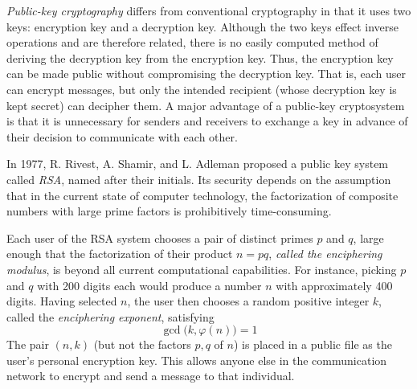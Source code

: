 \documentclass{article}
\begin{document}
\textit{Public-key cryptography} differs from conventional cryptography in that it uses two keys: encryption key and a decryption key. Although the two keys effect inverse operations and are therefore related, there is no easily computed method of deriving the decryption key from the encryption key. Thus, the encryption key can be made public without compromising the decryption key. That is, each user can encrypt messages, but only the intended recipient (whose decryption key is kept secret) can decipher them. A major advantage of a public-key cryptosystem is that it is unnecessary for senders and receivers to exchange a key in advance of their decision to communicate with each other. 

In 1977, R. Rivest, A. Shamir, and L. Adleman proposed a public key system called \textit{RSA}, named after their initials. Its security depends on the assumption that in the current state of computer technology, the factorization of composite numbers with large prime factors is prohibitively time-consuming. 

Each user of the RSA system chooses a pair of distinct primes $p$ and $q$, large enough that the factorization of their product $n = pq$, \textit{called the enciphering modulus}, is beyond all current computational capabilities. For instance, picking $p$ and $q$ with 200 digits each would produce a number $n$ with approximately 400 digits. Having selected $n$, the user then chooses a random positive integer $k$, called the \textit{enciphering exponent}, satisfying
\begin{equation}
  \gcd\big(k, \varphi(n)\big) = 1
\end{equation}
The pair $(n, k)$ (but not the factors $p, q$ of $n$) is placed in a public file as the user's personal encryption key. This allows anyone else in the communication network to encrypt and send a message to that individual. 
\end{document}
